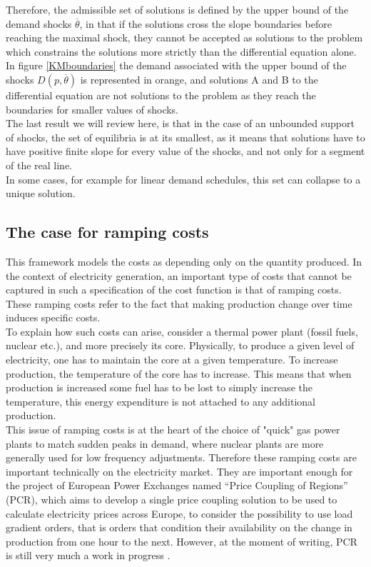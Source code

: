 Therefore, the admissible set of solutions is defined by the upper bound of the demand shocks $\overline{\theta}$, in that if the solutions cross the slope boundaries before reaching the maximal shock, they cannot be accepted as solutions to the problem which constrains the solutions more strictly than the differential equation alone. In figure \ref{KMboundaries} the demand associated with the upper bound of the shocks $D(p,\overline{\theta})$ is represented in orange, and solutions A and B to the differential equation are not solutions to the problem as they reach the boundaries for smaller values of shocks.\\

The last result we will review here, is that in the case of an unbounded support of shocks, the set of equilibria is at its smallest, as it means that solutions have to have positive finite slope for every value of the shocks, and not only for a segment of the real line. \\

In some cases, for example for linear demand schedules, this set can collapse to a unique solution. \\

\subsection*{The case for ramping costs}

This framework models the costs as depending only on the quantity produced. In the context of electricity generation, an important type of costs that cannot be captured in such a specification of the cost function is that of ramping costs. These ramping costs refer to the fact that making production change over time induces specific costs.\\

To explain how such costs can arise, consider a thermal power plant (fossil fuels, nuclear etc.), and more precisely its core. Physically, to produce a given level of electricity, one has to maintain the core at a given temperature. To increase production, the temperature of the core has to increase. This means that when production is increased some fuel has to be lost to simply increase the temperature, this energy expenditure is not attached to any additional production.\\

This issue of ramping costs is at the heart of the choice of "quick" gas power plants to match sudden peaks in demand, where nuclear plants are more generally used for low frequency adjustments. Therefore these ramping costs are important technically on the electricity market. They are important enough for the project of European Power Exchanges named ``Price Coupling of Regions'' (PCR), which aims to develop a single price coupling solution to be used to calculate electricity prices across Europe, to consider the possibility to use load gradient orders, that is orders that condition their availability on the change in production from one hour to the next. However, at the moment of writing, PCR is still very much a work in progress \cite{EPEXPCR}.\\

